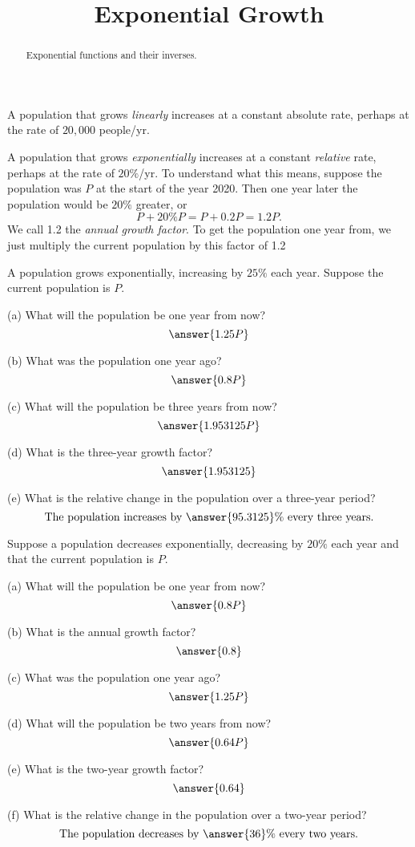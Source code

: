 \documentclass{ximera}
\title{Exponential Growth}
\begin{document}
\begin{abstract}
Exponential functions and their inverses.
\end{abstract}
\maketitle

A population that grows \emph{linearly} increases at a constant absolute rate, perhaps at the rate of $20,000$ people/yr. 

A population that grows \emph{exponentially} increases at a constant \emph{relative} rate, perhaps at the rate of $20\%$/yr. To understand what this means, suppose the population was $P$ at the start of the year 2020. Then one year later the population would be $20\%$ greater, or 
\[
   P + 20\% P  = P + 0.2 P = 1.2P .
\]
We call 1.2 the \emph{annual growth factor}. To get the population one year from, we just multiply the current population by this factor of 1.2

\begin{question}  \label{Q00:ExponentialG}
A population grows exponentially, increasing by $25\%$ each year. Suppose the current population is $P$.

(a) What will the population be one year from now?
\[
\answer{1.25P}
\]
 
(b) What was the population one year ago?
\[
\answer{0.8P}
\]

(c) What will the population be three years from now?
\[
\answer{1.953125P}
\]

(d) What is the three-year growth factor?
\[
\answer{1.953125}
\]

(e) What is the relative change in the population over a three-year period?
\[
\text{The population increases by } \answer{95.3125}\% \text{ every three years.}
\]

\end{question}


\begin{question}  \label{Q1:ExponentialG}
Suppose a population decreases exponentially, decreasing by $20\%$ each year and that the current population is $P$. 

(a) What will the population be one year from now?  
\[
\answer{0.8P}
\]

(b) What is the annual growth factor?
\[
   \answer{0.8}
\]

(c) What was the population one year ago?
\[
\answer{1.25P}
\]

(d) What will the population be two years from now?
\[
\answer{0.64P}
\]

(e) What is the two-year growth factor?
\[
\answer{0.64}
\]

(f) What is the relative change in the population over a two-year period?
\[
\text{The population decreases by } \answer{36}\% \text{ every two years.}
\]

\end{question}
\end{document}
